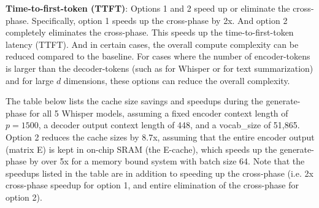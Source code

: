 \documentclass{article}
\begin{document}
\textbf{Time-to-first-token (TTFT)}: Options 1 and 2 speed up or eliminate the cross-phase. Specifically, option 1 speeds up the cross-phase by 2x. And option 2 completely eliminates the cross-phase. This speeds up the time-to-first-token latency (TTFT). And in certain cases, the overall compute complexity can be reduced compared to the baseline. For cases where the number of encoder-tokens is larger than the decoder-tokens (such as for Whisper or for text summarization) and for large $d$ dimensions, these options can reduce the overall complexity.

The table below lists the cache size savings and speedups during the generate-phase for all 5 Whisper models, assuming a fixed encoder context length of $p = 1500$, a decoder output context length of 448, and a vocab\_size of 51,865. Option 2 reduces the cache sizes by 8.7x, assuming that the entire encoder output (matrix E) is kept in on-chip SRAM (the E-cache), which speeds up the generate-phase by over 5x for a memory bound system with batch size 64. Note that the speedups listed in the table are in addition to speeding up the cross-phase (i.e. 2x cross-phase speedup for option 1, and entire elimination of the cross-phase for option 2).
\end{document}
